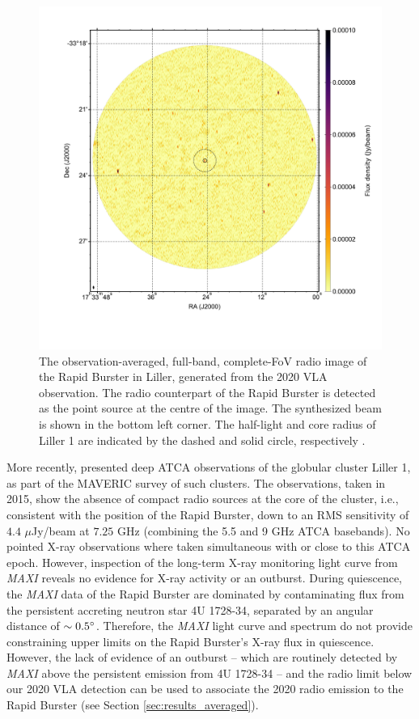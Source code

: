 \documentclass[fleqn,usenatbib]{mnras}
\begin{document}
\begin{figure}
\includegraphics[width=\columnwidth]{FULLFIELD.pdf}
 \caption{The observation-averaged, full-band, complete-FoV radio image of the Rapid Burster in Liller, generated from the 2020 VLA observation. The radio counterpart of the Rapid Burster is detected as the point source at the centre of the image. The synthesized beam is shown in the bottom left corner. The half-light and core radius of Liller 1 are indicated by the dashed and solid circle, respectively \citep{tudor2022}.}
 \label{fig:fullfield}
\end{figure}

More recently, \citet{tudor2022} presented deep ATCA observations of the globular cluster Liller 1, as part of the MAVERIC survey of such clusters. The observations, taken in 2015, show the absence of compact radio sources at the core of the cluster, i.e., consistent with the position of the Rapid Burster, down to an RMS sensitivity of $4.4$ $\mu$Jy/beam at $7.25$ GHz (combining the 5.5 and 9 GHz ATCA basebands). No pointed X-ray observations where taken simultaneous with or close to this ATCA epoch. However, inspection of the long-term X-ray monitoring light curve from \textit{MAXI} reveals no evidence for X-ray activity or an outburst. During quiescence, the \textit{MAXI} data of the Rapid Burster are dominated by contaminating flux from the persistent accreting neutron star 4U 1728-34, separated by an angular distance of $\sim 0.5\degree$. Therefore, the \textit{MAXI} light curve and spectrum do not provide constraining upper limits on the Rapid Burster's X-ray flux in quiescence. However, the lack of evidence of an outburst -- which are routinely detected by \textit{MAXI} above the persistent emission from 4U 1728-34 -- and the radio limit below our 2020 VLA detection can be used to associate the 2020 radio emission to the Rapid Burster (see Section \ref{sec:results_averaged}). 
\end{document}
